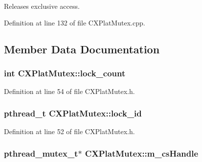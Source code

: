 \-Releases exclusive access. 



\-Definition at line 132 of file \-C\-X\-Plat\-Mutex.\-cpp.



\subsection{\-Member \-Data \-Documentation}
\hypertarget{class_c_x_plat_mutex_a64d6f2b157694146b3836879ca282050}{
\subsubsection[{lock\-\_\-count}]{\setlength{\rightskip}{0pt plus 5cm}int {\bf \-C\-X\-Plat\-Mutex\-::lock\-\_\-count}}}\label{class_c_x_plat_mutex_a64d6f2b157694146b3836879ca282050}


\-Definition at line 54 of file \-C\-X\-Plat\-Mutex.\-h.

\hypertarget{class_c_x_plat_mutex_a9c41baa3d5371a523333843b8149bfc0}{
\subsubsection[{lock\-\_\-id}]{\setlength{\rightskip}{0pt plus 5cm}pthread\-\_\-t {\bf \-C\-X\-Plat\-Mutex\-::lock\-\_\-id}}}\label{class_c_x_plat_mutex_a9c41baa3d5371a523333843b8149bfc0}


\-Definition at line 52 of file \-C\-X\-Plat\-Mutex.\-h.

\hypertarget{class_c_x_plat_mutex_a22ce962174742cd232815a7fcfae5905}{
\subsubsection[{m\-\_\-cs\-Handle}]{\setlength{\rightskip}{0pt plus 5cm}pthread\-\_\-mutex\-\_\-t$\ast$ {\bf \-C\-X\-Plat\-Mutex\-::m\-\_\-cs\-Handle}}}\label{class_c_x_plat_mutex_a22ce962174742cd232815a7fcfae5905}


